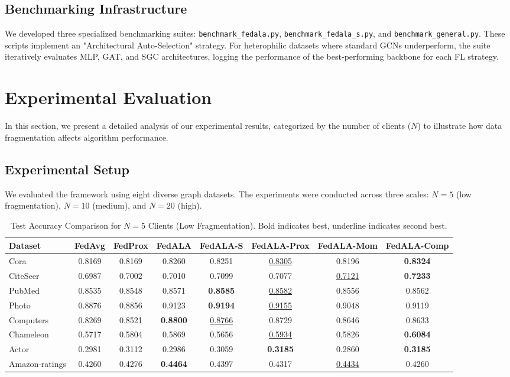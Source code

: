 \documentclass[10pt,conference,compsocconf,letterpaper]{IEEEtran}
\begin{document}
\subsection{Benchmarking Infrastructure}
We developed three specialized benchmarking suites: \texttt{benchmark\_fedala.py}, \texttt{benchmark\_fedala\_s.py}, and \texttt{benchmark\_general.py}. These scripts implement an "Architectural Auto-Selection" strategy. For heterophilic datasets where standard GCNs underperform, the suite iteratively evaluates MLP, GAT, and SGC architectures, logging the performance of the best-performing backbone for each FL strategy.

\section{Experimental Evaluation}

In this section, we present a detailed analysis of our experimental results, categorized by the number of clients ($N$) to illustrate how data fragmentation affects algorithm performance.

\subsection{Experimental Setup}
We evaluated the framework using eight diverse graph datasets. The experiments were conducted across three scales: $N=5$ (low fragmentation), $N=10$ (medium), and $N=20$ (high).

\begin{table}[t]
\centering
\caption{Test Accuracy Comparison for $N=5$ Clients (Low Fragmentation). Bold indicates best, underline indicates second best.}
\label{tab:results_n5}
\begin{tabular}{@{}lccccccc@{}}
\toprule
\textbf{Dataset} & \textbf{FedAvg} & \textbf{FedProx} & \textbf{FedALA} & \textbf{FedALA-S} & \textbf{FedALA-Prox} & \textbf{FedALA-Mom} & \textbf{FedALA-Comp} \\ \midrule
Cora & 0.8169 & 0.8169 & 0.8260 & 0.8251 & \underline{0.8305} & 0.8196 & \textbf{0.8324} \\
CiteSeer & 0.6987 & 0.7002 & 0.7010 & 0.7099 & 0.7077 & \underline{0.7121} & \textbf{0.7233} \\
PubMed & 0.8535 & 0.8548 & 0.8571 & \textbf{0.8585} & \underline{0.8582} & 0.8556 & 0.8562 \\
Photo & 0.8876 & 0.8856 & 0.9123 & \textbf{0.9194} & \underline{0.9155} & 0.9048 & 0.9119 \\
Computers & 0.8269 & 0.8521 & \textbf{0.8800} & \underline{0.8766} & 0.8729 & 0.8646 & 0.8633 \\
Chameleon & 0.5717 & 0.5804 & 0.5869 & 0.5656 & \underline{0.5934} & 0.5826 & \textbf{0.6084} \\
Actor & 0.2981 & 0.3112 & 0.2986 & 0.3059 & \textbf{0.3185} & 0.2860 & \textbf{0.3185} \\
Amazon-ratings & 0.4260 & 0.4276 & \textbf{0.4464} & 0.4397 & 0.4317 & \underline{0.4434} & 0.4260 \\ \bottomrule
\end{tabular}
\end{table}
\end{document}
